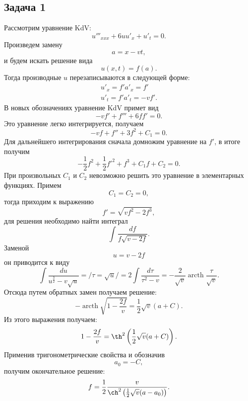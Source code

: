 \documentclass[12pt,a4paper]{article}
\DeclareMathOperator\arcth{arcth}
\begin{document}
\subsection*{Задача 1}
\noindent Рассмотрим уравнение KdV:
\begin{equation}
u'''_{xxx}+6uu'_x+u'_t=0.
\end{equation} 
Произведем замену
\begin{equation}
a = x-vt,
\end{equation}
и будем искать решение вида
\begin{equation}
u(x,t) = f(a).
\end{equation} 
Тогда производные $u$ перезаписываются в следующей форме:
\begin{equation}
\begin{gathered}
u'_x = f'a'_x=f'\\
u'_t = f'a'_t=-vf'.
\end{gathered}
\end{equation}
В новых обозначениях уравнение KdV примет вид
\begin{equation}
-vf'+f'''+6ff'=0.
\end{equation}
Это уравнение легко интегрируется, получаем
\begin{equation}
-vf + f'' + 3f^2 + C_1=0.
\end{equation}
Для дальнейшего интегрирования сначала домножим уравнение на $f'$, в итоге получим
\begin{equation}
-\frac{1}{2}f^2+\frac{1}{2}f'^2+f^3+C_1f+C_2=0.
\end{equation}
При произвольных $C_1$ и $C_2$ невозможно решить это уравнение в элементарных функциях. Примем
\begin{equation}
C_1=C_2=0,
\end{equation}
тогда приходим к выражению
\begin{equation}
f' = \sqrt{vf^2-2f^3},
\end{equation}
для решения необходимо найти интеграл
\begin{equation}
\int \frac{d f}{f\sqrt{v-2f}}.
\end{equation}
Заменой
\begin{equation}
u = v-2f
\end{equation}
он приводится к виду
\begin{equation}
\int \frac{d u}{u^{\frac{3}{2}}-v\sqrt{u}}=/\tau = \sqrt{u}/ = 2\int\frac{d\tau}{\tau^2-v}=-\frac{2}{\sqrt{v}}\arcth\frac{\tau}{\sqrt{v}}.
\end{equation}
Отсюда путем обратных замен получаем решение:
\begin{equation}
-\arcth\sqrt{1-\frac{2f}{v}} =\frac{1}{2}\sqrt{v}(a + C).
\end{equation}
Из этого выражения получаем:
\begin{equation}
1-\frac{2f}{v} = \th^2\left(\frac{1}{2}\sqrt{v}(a + C)\right).
\end{equation}
Применив тригонометрические свойства и обозначив
\begin{equation}
a_0 = -C,
\end{equation}
получим окончательное решение:
\begin{equation}
f = \frac{1}{2}\frac{v}{\ch^2\left(\frac{1}{2}\sqrt{v}(a - a_0)\right)}.
\end{equation}
\end{document}
